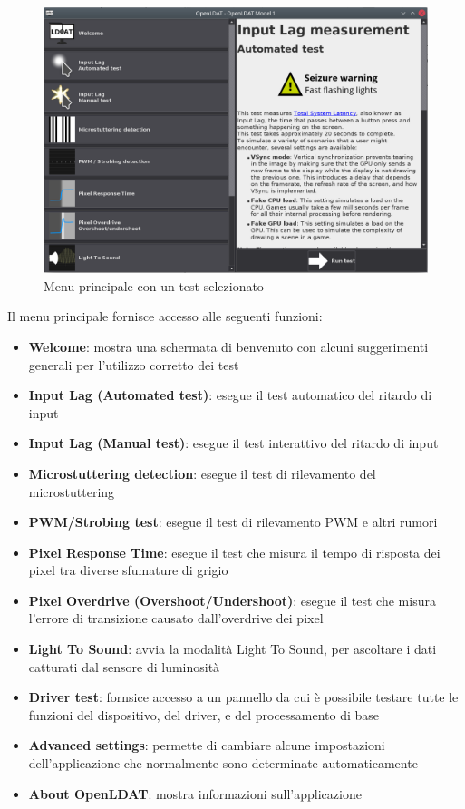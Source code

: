 \begin{figure}[h]
	\centering
	\includegraphics[width=\textwidth]{Applicazione_files/gui_mainMenu2.png}
	\caption{Menu principale con un test selezionato}
	\label{fig:gui_mainMenu2}
\end{figure}

Il menu principale fornisce accesso alle seguenti funzioni:\begin{itemize}
	\item \textbf{Welcome}: mostra una schermata di benvenuto con alcuni suggerimenti generali per l'utilizzo corretto dei test
	\item \textbf{Input Lag (Automated test)}: esegue il test automatico del ritardo di input
	\item \textbf{Input Lag (Manual test)}: esegue il test interattivo del ritardo di input
	\item \textbf{Microstuttering detection}: esegue il test di rilevamento del microstuttering
	\item \textbf{PWM/Strobing test}: esegue il test di rilevamento PWM e altri rumori
	\item \textbf{Pixel Response Time}: esegue il test che misura il tempo di risposta dei pixel tra diverse sfumature di grigio
	\item \textbf{Pixel Overdrive (Overshoot/Undershoot)}: esegue il test che misura l'errore di transizione causato dall'overdrive dei pixel
	\item \textbf{Light To Sound}: avvia la modalità Light To Sound, per ascoltare i dati catturati dal sensore di luminosità
	\item \textbf{Driver test}: fornsice accesso a un pannello da cui è possibile testare tutte le funzioni del dispositivo, del driver, e del processamento di base
	\item \textbf{Advanced settings}: permette di cambiare alcune impostazioni dell'applicazione che normalmente sono determinate automaticamente
	\item \textbf{About OpenLDAT}: mostra informazioni sull'applicazione
\end{itemize}

